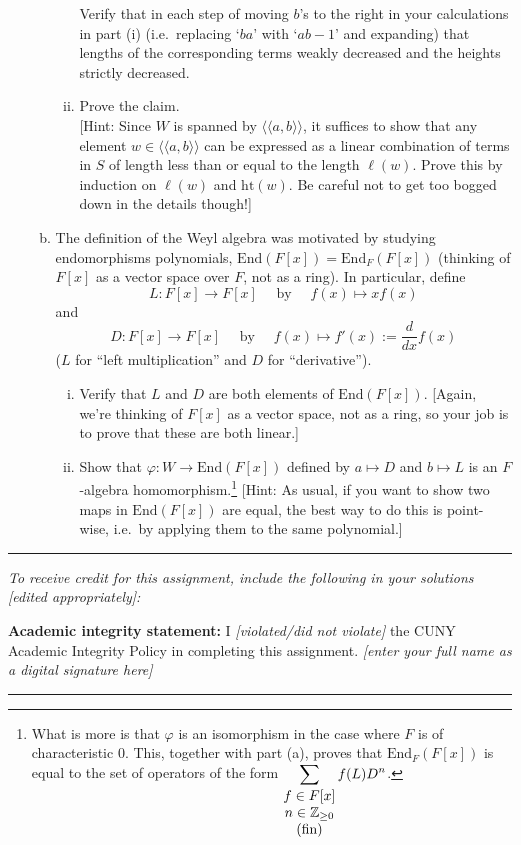 \documentclass[11pt, reqno]{amsart}
\theoremstyle{plain}
\theoremstyle{definition}
\theoremstyle{example}
\def\<{\langle} \def\>{\rangle}
\def\({\<\!\<}\def\){\>\!\>}
\def\End{\mathrm{End}}
\def\hgt{\mathrm{ht}}
\def\f{\varphi}
\begin{document}
\begin{enumerate}[1.]
\begin{enumerate}[(a)]
\begin{enumerate}[(i)]
Verify that in each step of moving $b$'s to the right in your calculations in part (i) (i.e.\ replacing `$ba$' with `$ab - 1$' and expanding) that lengths of the corresponding terms weakly decreased and the heights strictly decreased. 


\item Prove the claim.  \\
{[Hint: 
Since $W$ is spanned by $\(a,b\)$, it suffices to show that any element $w \in \(a,b\)$ can be expressed as a linear combination of terms in $S$ of length less than or equal to the length $\ell(w)$. Prove this by induction on $\ell(w)$ and $\hgt(w)$. Be careful not to get too bogged down in the details though!]}
\end{enumerate}

\item The definition of the Weyl algebra was motivated by studying endomorphisms polynomials, $\End(F[x]) = \End_F(F[x])$ (thinking of $F[x]$ as a vector space over $F$, not as a ring). In particular, define 
$$L: F[x] \to F[x] \quad \text{ by } \quad f(x) \mapsto xf(x)$$
and 
$$D: F[x] \to F[x] \quad \text{ by } \quad f(x) \mapsto f'(x) := \frac{d}{dx} f(x)$$
($L$ for ``left multiplication'' and $D$ for ``derivative''). 
\begin{enumerate}[(i)]
\item Verify that $L$ and $D$ are both elements of $\End(F[x])$. {[Again, we're thinking of $F[x]$ as a vector space, not as a ring, so your job is to prove that these are both linear.]}
\item Show that $\f: W \to \End(F[x])$ defined by $a \mapsto D$ and $b \mapsto L$ is an $F$-algebra homomorphism.\footnote{What is more is that $\f$ is an isomorphism in the case where $F$ is of characteristic $0$. This, together with part (a), proves that $\End_F(F[x])$ is equal to the set of operators of the form $\displaystyle \sum_{\begin{matrix}f \in F[x] \\ n \in \mathbb{Z}_{\ge 0} \\ \text{(fin)}\end{matrix}} f(L)D^n$.} {[Hint: As usual, if you want to show two maps in $\End(F[x])$ are equal, the best way to do this is point-wise, i.e.\ by applying them to the same polynomial.]}


\end{enumerate}




\end{enumerate}
\end{enumerate}

\vfill


\hrule
\emph{\small To receive credit for this assignment, include the following in your solutions [edited appropriately]:}

\smallskip

\textbf{Academic integrity statement:} I \emph{[violated/did not violate]} the CUNY Academic Integrity Policy in completing this assignment. \hfill \emph{[enter your full name as a digital signature here]}

\medskip
\hrule

\vfill
\end{document}
